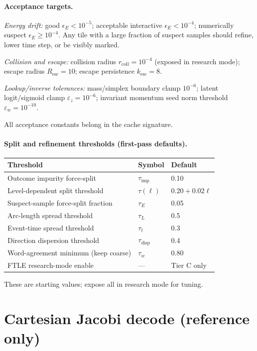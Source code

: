 \documentclass[11pt]{report}
\begin{document}
\paragraph{Acceptance targets.}

\emph{Energy drift:} good $\epsilon_E<10^{-5}$; acceptable interactive $\epsilon_E<10^{-4}$; numerically suspect $\epsilon_E\ge 10^{-4}$. Any tile with a large fraction of suspect samples should refine, lower time step, or be visibly marked.

\emph{Collision and escape:} collision radius $r_{\mathrm{coll}}=10^{-4}$ (exposed in research mode); escape radius $R_{\mathrm{esc}}=10$; escape persistence $k_{\mathrm{esc}}=8$.

\emph{Lookup/inverse tolerances:} mass/simplex boundary clamp $10^{-6}$; latent logit/sigmoid clamp $\varepsilon_z=10^{-6}$; invariant momentum seed norm threshold $\varepsilon_w=10^{-10}$.

All acceptance constants belong in the cache signature.

\paragraph{Split and refinement thresholds (first-pass defaults).}

\begin{center}
\begin{tabular}{lll}
\toprule
Threshold & Symbol & Default \\
\midrule
Outcome impurity force-split & $\tau_{\mathrm{imp}}$ & 0.10 \\
Level-dependent split threshold & $\tau(\ell)$ & $0.20+0.02\ell$ \\
Suspect-sample force-split fraction & $\tau_E$ & 0.05 \\
Arc-length spread threshold & $\tau_L$ & 0.5 \\
Event-time spread threshold & $\tau_t$ & 0.3 \\
Direction dispersion threshold & $\tau_{\mathrm{disp}}$ & 0.4 \\
Word-agreement minimum (keep coarse) & $\tau_w$ & 0.80 \\
FTLE research-mode enable & --- & Tier C only \\
\bottomrule
\end{tabular}
\end{center}

These are starting values; expose all in research mode for tuning.

\section{Cartesian Jacobi decode (reference only)}
\label{app:cartesian_jacobi}
\end{document}
